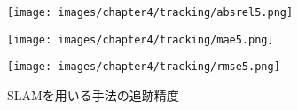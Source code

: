 \begin{figure}[h]
	\centering
	\begin{minipage}[t]{0.6\linewidth}
		\centering
		\texttt{[image: images/chapter4/tracking/absrel5.png]}
		\label{fig:tracking_absrel2}
	\end{minipage}
	\begin{minipage}[t]{0.6\linewidth}
		\centering
		\texttt{[image: images/chapter4/tracking/mae5.png]}
		\label{fig:tracking_mae2}
	\end{minipage}
	\begin{minipage}[t]{0.6\linewidth}
		\centering
		\texttt{[image: images/chapter4/tracking/rmse5.png]}
		\label{fig:tracking_rmse2}
	\end{minipage}
	\caption{SLAMを用いる手法の追跡精度}
	\label{fig:slam_tracking_result}
\end{figure}